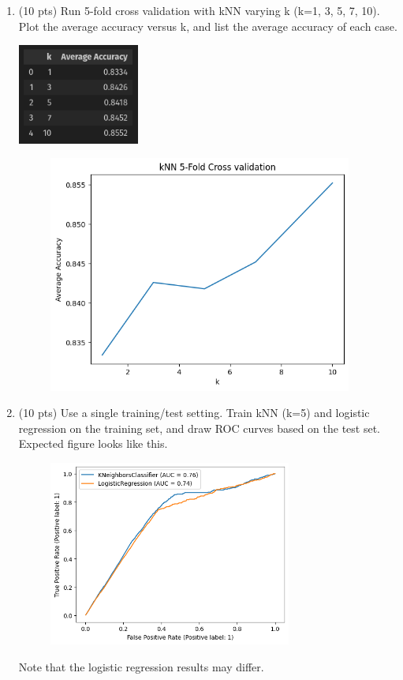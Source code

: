 \documentclass[a4paper]{article}
\theoremstyle{definition}
\newenvironment{soln}{
    \leavevmode\color{blue}\ignorespaces
}{}
\begin{document}
\begin{enumerate}
	\item (10 pts) Run 5-fold cross validation with kNN varying k (k=1, 3, 5, 7, 10). Plot the average accuracy versus k, and list the average accuracy of each case. \\
	
	\begin{soln}
            \includegraphics[width=4cm]{2_4_list.png}
    	\begin{figure}[h]
    		\centering
    		\includegraphics[width=10cm]{2_4.png}
    	\end{figure}
        \end{soln}
	
	\item (10 pts) Use a single training/test setting. Train kNN (k=5) and logistic regression on the training set, and draw ROC curves based on the test set. \\
	Expected figure looks like this.
	\begin{figure}[h]
		\centering
		\includegraphics[width=8cm]{2_5.png}
	\end{figure}
	Note that the logistic regression results may differ.
	

\end{enumerate}
\end{document}
